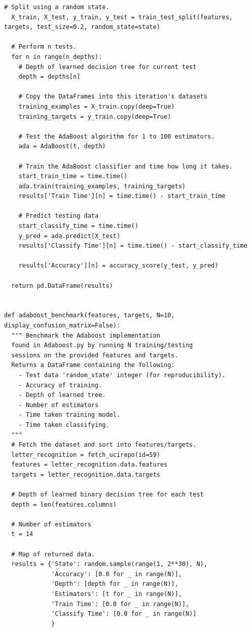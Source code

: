 \documentclass[a4paper]{article}
\begin{document}
\begin{lstlisting}[basicstyle= \scriptsize]
  # Split using a random state.
  X_train, X_test, y_train, y_test = train_test_split(features, targets, test_size=0.2, random_state=state)

  # Perform n tests.
  for n in range(n_depths):
    # Depth of learned decision tree for current test
    depth = depths[n]

    # Copy the DataFrames into this iteration's datasets
    training_examples = X_train.copy(deep=True)
    training_targets = y_train.copy(deep=True)

    # Test the AdaBoost algorithm for 1 to 100 estimators.
    ada = AdaBoost(t, depth) 

    # Train the AdaBoost classifier and time how long it takes.
    start_train_time = time.time()
    ada.train(training_examples, training_targets)
    results['Train Time'][n] = time.time() - start_train_time 

    # Predict testing data
    start_classify_time = time.time()
    y_pred = ada.predict(X_test)
    results['Classify Time'][n] = time.time() - start_classify_time

    results['Accuracy'][n] = accuracy_score(y_test, y_pred)

  return pd.DataFrame(results)


def adaboost_benchmark(features, targets, N=10, display_confusion_matrix=False):
  """ Benchmark the Adaboost implementation
  found in Adaboost.py by running N training/testing
  sessions on the provided features and targets. 
  Returns a DataFrame containing the following:
    - Test data 'random_state' integer (for reproducibility).
    - Accuracy of training.
    - Depth of learned tree.
    - Number of estimators
    - Time taken training model.
    - Time taken classifying.
  """
  # Fetch the dataset and sort into features/targets.
  letter_recognition = fetch_ucirepo(id=59) 
  features = letter_recognition.data.features
  targets = letter_recognition.data.targets

  # Depth of learned binary decision tree for each test
  depth = len(features.columns) 

  # Number of estimators 
  t = 14 

  # Map of returned data.
  results = {'State': random.sample(range(1, 2**30), N),
             'Accuracy': [0.0 for _ in range(N)],
             'Depth': [depth for _ in range(N)],
             'Estimators': [t for _ in range(N)],
             'Train Time': [0.0 for _ in range(N)],
             'Classify Time': [0.0 for _ in range(N)]
             }
  

\end{lstlisting}
\end{document}
